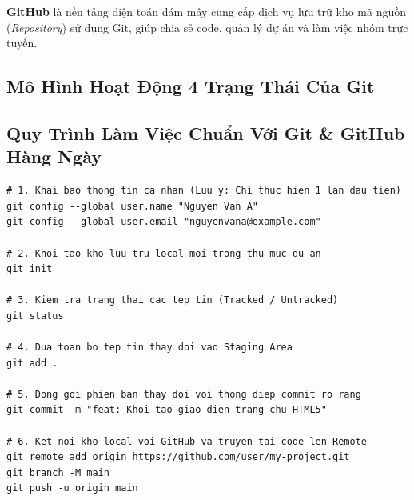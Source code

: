 \documentclass[11pt,oneside]{book}
\newcommand{\thd}[1]{\textcolor{white}{\textbf{\strut #1}}}
\newcommand{\codeinline}[1]{\textcolor{accentOrange}{\texttt{#1}}}
\newcommand{\term}[1]{\textbf{\textcolor{primaryBlue}{#1}}}
\begin{document}
\term{GitHub} là nền tảng điện toán đám mây cung cấp dịch vụ lưu trữ kho mã nguồn (\textit{Repository}) sử dụng Git, giúp chia sẻ code, quản lý dự án và làm việc nhóm trực tuyến.

\subsection{Mô Hình Hoạt Động 4 Trạng Thái Của Git}

\begin{prettyTableBox}
\end{prettyTableBox}

\subsection{Quy Trình Làm Việc Chuẩn Với Git \& GitHub Hàng Ngày}

\begin{codeWindow}
\begin{lstlisting}[language=HTTP]
# 1. Khai bao thong tin ca nhan (Luu y: Chi thuc hien 1 lan dau tien)
git config --global user.name "Nguyen Van A"
git config --global user.email "nguyenvana@example.com"

# 2. Khoi tao kho luu tru local moi trong thu muc du an
git init

# 3. Kiem tra trang thai cac tep tin (Tracked / Untracked)
git status

# 4. Dua toan bo tep tin thay doi vao Staging Area
git add .

# 5. Dong goi phien ban thay doi voi thong diep commit ro rang
git commit -m "feat: Khoi tao giao dien trang chu HTML5"

# 6. Ket noi kho local voi GitHub va truyen tai code len Remote
git remote add origin https://github.com/user/my-project.git
git branch -M main
git push -u origin main
\end{lstlisting}
\end{codeWindow}
\end{document}
